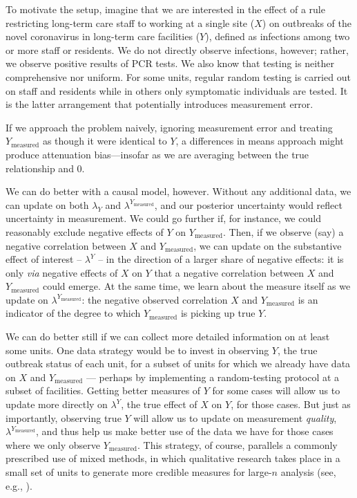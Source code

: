 \documentclass[
  12pt,
]{book}
\begin{document}
To motivate the setup, imagine that we are interested in the effect of a rule restricting long-term care staff to working at a single site (\(X\)) on outbreaks of the novel coronavirus in long-term care facilities (\(Y\)), defined as infections among two or more staff or residents. We do not directly observe infections, however; rather, we observe positive results of PCR tests. We also know that testing is neither comprehensive nor uniform. For some units, regular random testing is carried out on staff and residents while in others only symptomatic individuals are tested. It is the latter arrangement that potentially introduces measurement error.

If we approach the problem naively, ignoring measurement error and treating \(Y_\text{measured}\) as though it were identical to \(Y\), a differences in means approach might produce attenuation bias---insofar as we are averaging between the true relationship and 0.

We can do better with a causal model, however. Without any additional data, we can update on both \(\lambda_Y\) and \(\lambda^{Y_\text{measured}}\), and our posterior uncertainty would reflect uncertainty in measurement. We could go further if, for instance, we could reasonably exclude negative effects of \(Y\) on \(Y_\text{measured}\). Then, if we observe (say) a negative correlation between \(X\) and \(Y_\text{measured}\), we can update on the substantive effect of interest -- \(\lambda^Y\) -- in the direction of a larger share of negative effects: it is only \emph{via} negative effects of \(X\) on \(Y\) that a negative correlation between \(X\) and \(Y_\text{measured}\) could emerge. At the same time, we learn about the measure itself as we update on \(\lambda^{Y_\text{measured}}\): the negative observed correlation \(X\) and \(Y_\text{measured}\) is an indicator of the degree to which \(Y_\text{measured}\) is picking up true \(Y\).

We can do better still if we can collect more detailed information on at least some units. One data strategy would be to invest in observing \(Y\), the true outbreak status of each unit, for a subset of units for which we already have data on \(X\) and \(Y_\text{measured}\) --- perhaps by implementing a random-testing protocol at a subset of facilities. Getting better measures of \(Y\) for some cases will allow us to update more directly on \(\lambda^Y\), the true effect of \(X\) on \(Y\), for those cases. But just as importantly, observing true \(Y\) will allow us to update on measurement \emph{quality}, \(\lambda^{Y_\text{measured}}\), and thus help us make better use of the data we have for those cases where we only observe \(Y_\text{measured}\). This strategy, of course, parallels a commonly prescribed use of mixed methods, in which qualitative research takes place in a small set of units to generate more credible measures for large-\(n\) analysis (see, e.g., \citet{seawrightbook}).
\end{document}
